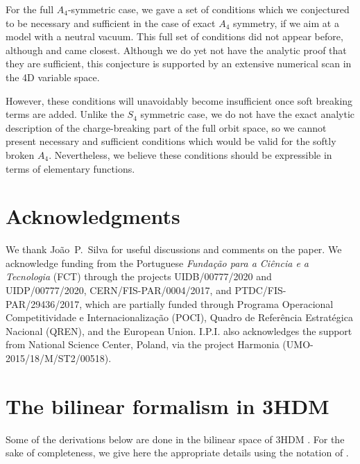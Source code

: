 \documentclass[11pt]{article}
\begin{document}
For the full $A_4$-symmetric case, we gave a set of conditions which we conjectured to be necessary and sufficient
in the case of exact $A_4$ symmetry, if we aim at a model with a neutral vacuum.
This full set of conditions did not appear before, although \cite{Dekens:2011} and \cite{Pramanick:2017wry} came closest.
Although we do yet not have the analytic proof that they are sufficient, 
this conjecture is supported by an extensive numerical scan in the 4D variable space.

However, these conditions will unavoidably become insufficient once soft breaking terms are added.
Unlike the $S_4$ symmetric case, we do not have the exact analytic description of the charge-breaking part of the full orbit space,
so we cannot present necessary and sufficient conditions which would be valid for the softly broken $A_4$.
Nevertheless, we believe these conditions should be expressible in terms of elementary functions.

\section*{Acknowledgments}
We thank Jo\~{a}o~P.\ Silva for useful discussions and comments on the paper. 
We acknowledge funding from the Portuguese \textit{Fun\-da\-\c{c}\~{a}o para a Ci\^{e}ncia e a Tecnologia} (FCT) through the projects UIDB/00777/2020 and UIDP/00777/2020, CERN/FIS-PAR/0004/2017, and PTDC/FIS-PAR/29436/2017, which are partially funded through Programa Operacional Competitividade e
Internacionalização (POCI), Quadro de Refer\^{e}ncia
Estrat\'{e}gica Nacional (QREN), and the European Union. 
I.P.I. also acknowledges the support from National Science Center, Poland, via the project Harmonia (UMO-2015/18/M/ST2/00518).





\appendix

\section{The bilinear formalism in 3HDM}\label{appendix:bilinear}

Some of the derivations below are done in the bilinear space of 3HDM
\cite{Nagel:PhD,Nishi:2006tg,Maniatis:2006fs,Nishi:2007nh,Ivanov:2010ww,Ivanov:2010wz,Maniatis:2014oza}.
For the sake of completeness, we give here the appropriate details using the notation of \cite{Ivanov:2010ww}.
\end{document}
